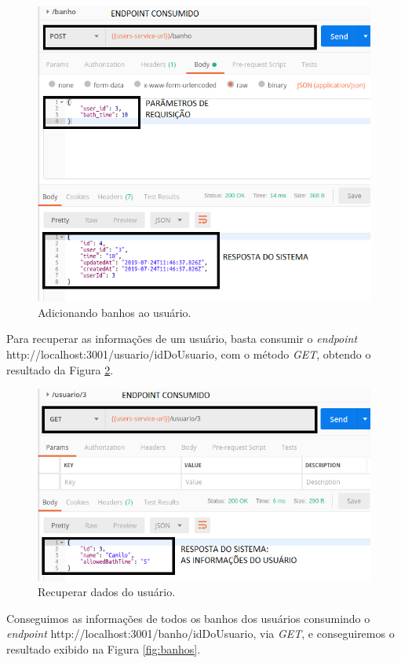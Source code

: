 \begin{figure}[htbp]
	\centering
	\includegraphics[width=0.7\linewidth]{figuras/postman/bathsinclude.png}
	\caption{Adicionando banhos ao usuário.}
	\label{fig:banho}
\end{figure}

Para recuperar as informações de um usuário, basta consumir o \textit{endpoint} \break http://localhost:3001/usuario/idDoUsuario, com o método \textit{GET}, obtendo o resultado da Figura \ref{fig:usuario}.

\begin{figure}[htbp]
	\centering
	\includegraphics[width=0.7\linewidth]{figuras/postman/getuser.png}
	\caption{Recuperar dados do usuário.}
	\label{fig:usuario}
\end{figure}

Conseguimos as informações de todos os banhos dos usuários consumindo o \textit{endpoint} http://localhost:3001/banho/idDoUsuario, via \textit{GET}, e conseguiremos o resultado exibido na Figura \ref{fig:banhos}.

